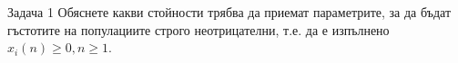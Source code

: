 \begin{frame}[t]{Задача 1}
Обяснете какви стойности трябва да приемат параметрите, за да бъдат гъстотите на популациите строго неотрицателни, т.е. да е изпълнено $x_{i}(n) \geq 0, n \geq 1$.
\end{frame}
